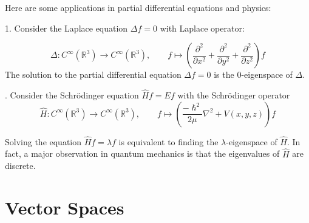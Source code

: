Here are some applications in partial differential equations and physics:
\begin{example}
1. Consider the Laplace equation \({\Delta f} = 0\) with Laplace operator:

\[
\Delta  : {C}^{\infty }\left( {\mathbb{R}}^{3}\right)  \rightarrow  {C}^{\infty }\left( {\mathbb{R}}^{3}\right), \quad \quad f \mapsto  \left( {\frac{{\partial }^2}{\partial {x}^2} + \frac{{\partial }^2}{\partial {y}^2} + \frac{{\partial }^2}{\partial {z}^2}}\right) f
\]
The solution to the partial differential equation \({\Delta f} = 0\) is the $0$-eigenspace of \(\Delta\).

. Consider the Schrödinger equation \(\widehat{H}f = {Ef}\) with the Schrödinger operator
\[
\widehat{H} : {C}^{\infty }\left( {\mathbb{R}}^{3}\right)  \rightarrow  {C}^{\infty }\left( {\mathbb{R}}^{3}\right),\quad \quad f \mapsto  \left(  {\frac{-{\hslash }^2}{2\mu }{\nabla }^2 + V\left( {x,y,z}\right) }\right)  f
\]

Solving the equation \(\widehat{H}f = \lambda f\) is equivalent to finding the $\lambda$-eigenspace of \(\widehat{H}\). In fact, a major observation in quantum mechanics is that the eigenvalues of \(\widehat{H}\) are discrete.    
\end{example}


\section{Vector Spaces}

